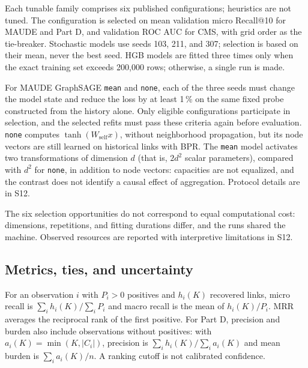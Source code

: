 Each tunable family comprises six published configurations; heuristics are not tuned. The configuration is selected on mean validation micro Recall@10 for MAUDE and Part D, and validation ROC AUC for CMS, with grid order as the tie-breaker. Stochastic models use seeds 103, 211, and 307; selection is based on their mean, never the best seed. HGB models are fitted three times only when the exact training set exceeds 200,000 rows; otherwise, a single run is made.

For MAUDE GraphSAGE \texttt{mean} and \texttt{none}, each of the three seeds must change the model state and reduce the loss by at least 1\,\% on the same fixed probe constructed from the history alone. Only eligible configurations participate in selection, and the selected refits must pass these criteria again before evaluation. \texttt{none} computes $\tanh(W_{\mathrm{self}}x)$, without neighborhood propagation, but its node vectors are still learned on historical links with BPR. The \texttt{mean} model activates two transformations of dimension $d$ (that is, $2d^2$ scalar parameters), compared with $d^2$ for \texttt{none}, in addition to node vectors: capacities are not equalized, and the contrast does not identify a causal effect of aggregation. Protocol details are in S12.

The six selection opportunities do not correspond to equal computational cost: dimensions, repetitions, and fitting durations differ, and the runs shared the machine. Observed resources are reported with interpretive limitations in S12.

\subsection{Metrics, ties, and uncertainty}
\label{sec:metrics}

For an observation $i$ with $P_i>0$ positives and $h_i(K)$ recovered links, micro recall is $\sum_i h_i(K)/\sum_i P_i$ and macro recall is the mean of $h_i(K)/P_i$. MRR averages the reciprocal rank of the first positive. For Part D, precision and burden also include observations without positives: with $a_i(K)=\min(K,|C_i|)$, precision is $\sum_i h_i(K)/\sum_i a_i(K)$ and mean burden is $\sum_i a_i(K)/n$. A ranking cutoff is not calibrated confidence.

